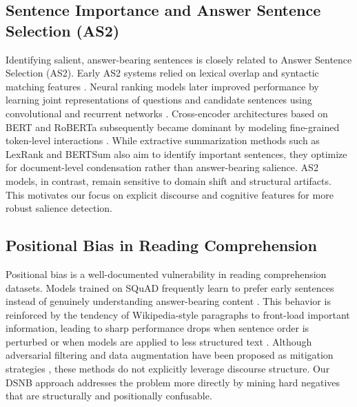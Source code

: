 \documentclass[11pt,a4paper,twocolumn]{article}
\begin{document}
\subsection{Sentence Importance and Answer Sentence Selection (AS2)}
Identifying salient, answer-bearing sentences is closely related to Answer Sentence Selection (AS2). Early AS2 systems relied on lexical overlap and syntactic matching features \cite{wang-etal-2007-jeopardy, severyn-moschitti-2015-learning}. Neural ranking models later improved performance by learning joint representations of questions and candidate sentences using convolutional and recurrent networks \cite{tay-etal-2018-multi, garg-etal-2020-tanda}. Cross-encoder architectures based on BERT and RoBERTa subsequently became dominant by modeling fine-grained token-level interactions \cite{nogueira-cho-2019-passage, karpukhin-etal-2020-dense}.
While extractive summarization methods such as LexRank \cite{erkan2004lexrank} and BERTSum \cite{liu2019text} also aim to identify important sentences, they optimize for document-level condensation rather than answer-bearing salience. AS2 models, in contrast, remain sensitive to domain shift and structural artifacts. This motivates our focus on explicit discourse and cognitive features for more robust salience detection.

\subsection{Positional Bias in Reading Comprehension}
Positional bias is a well-documented vulnerability in reading comprehension datasets. Models trained on SQuAD frequently learn to prefer early sentences instead of genuinely understanding answer-bearing content \cite{ko-etal-2020-look, jia-liang-2017-adversarial}. This behavior is reinforced by the tendency of Wikipedia-style paragraphs to front-load important information, leading to sharp performance drops when sentence order is perturbed or when models are applied to less structured text \cite{fisch-etal-2019-mrqa}. Although adversarial filtering and data augmentation have been proposed as mitigation strategies \cite{min-etal-2020-ambigqa, clark-etal-2020-electra}, these methods do not explicitly leverage discourse structure. Our DSNB approach addresses the problem more directly by mining hard negatives that are structurally and positionally confusable.
\end{document}
